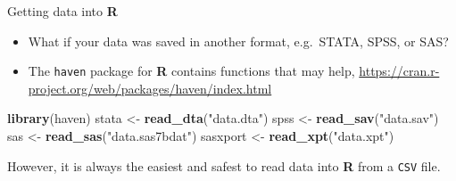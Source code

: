 \documentclass[ignorenonframetext,]{beamer}
\newenvironment{Shaded}{\begin{snugshade}}{\end{snugshade}}
\newcommand{\KeywordTok}[1]{\textcolor[rgb]{0.13,0.29,0.53}{\textbf{#1}}}
\newcommand{\StringTok}[1]{\textcolor[rgb]{0.31,0.60,0.02}{#1}}
\newcommand{\NormalTok}[1]{#1}
\providecommand{\tightlist}{%
  \setlength{\itemsep}{0pt}\setlength{\parskip}{0pt}}
\let\oldShaded\Shaded
\let\endoldShaded\endShaded
\renewenvironment{Shaded}{\footnotesize\oldShaded}{\endoldShaded}
\begin{document}
\begin{frame}[fragile]{Getting data into \textbf{R}}

\begin{itemize}
\tightlist
\item
  What if your data was saved in another format, e.g.~STATA, SPSS, or
  SAS?
\item
  The \texttt{haven} package for \textbf{R} contains functions that may
  help, \url{https://cran.r-project.org/web/packages/haven/index.html}
\end{itemize}

\begin{Shaded}
\begin{Highlighting}[]
\KeywordTok{library}\NormalTok{(haven)}
\NormalTok{stata <-}\StringTok{ }\KeywordTok{read_dta}\NormalTok{(}\StringTok{"data.dta"}\NormalTok{)}
\NormalTok{spss <-}\StringTok{ }\KeywordTok{read_sav}\NormalTok{(}\StringTok{"data.sav"}\NormalTok{)}
\NormalTok{sas <-}\StringTok{ }\KeywordTok{read_sas}\NormalTok{(}\StringTok{"data.sas7bdat"}\NormalTok{)}
\NormalTok{sasxport <-}\StringTok{ }\KeywordTok{read_xpt}\NormalTok{(}\StringTok{"data.xpt"}\NormalTok{)}
\end{Highlighting}
\end{Shaded}

However, it is always the easiest and safest to read data into
\textbf{R} from a \texttt{CSV} file.

\end{frame}
\end{document}
